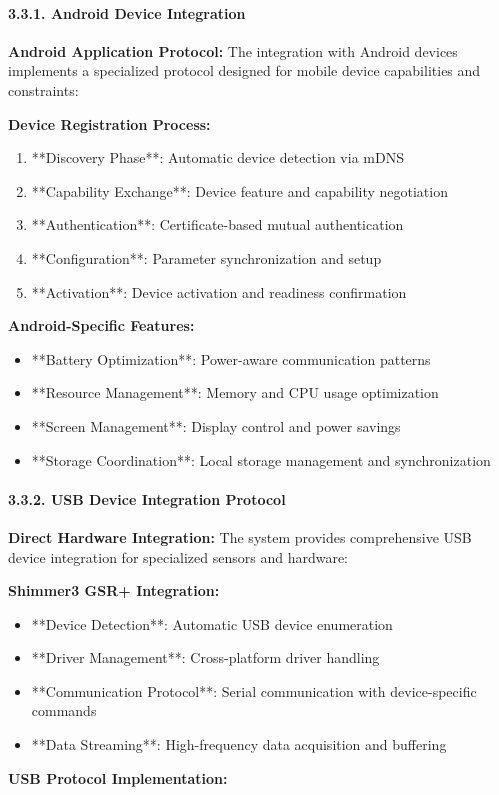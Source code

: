 \documentclass[12pt,a4paper]{article}
\begin{document}
\paragraph{3.3.1. Android Device Integration}

\textbf{Android Application Protocol:}
The integration with Android devices implements a specialized protocol designed for mobile device capabilities and
constraints:

\textbf{Device Registration Process:}

\begin{enumerate}
\item **Discovery Phase**: Automatic device detection via mDNS
\item **Capability Exchange**: Device feature and capability negotiation
\item **Authentication**: Certificate-based mutual authentication
\item **Configuration**: Parameter synchronization and setup
\item **Activation**: Device activation and readiness confirmation

\end{enumerate}
\textbf{Android-Specific Features:}

\begin{itemize}
\item **Battery Optimization**: Power-aware communication patterns
\item **Resource Management**: Memory and CPU usage optimization
\item **Screen Management**: Display control and power savings
\item **Storage Coordination**: Local storage management and synchronization

\end{itemize}
\paragraph{3.3.2. USB Device Integration Protocol}

\textbf{Direct Hardware Integration:}
The system provides comprehensive USB device integration for specialized sensors and hardware:

\textbf{Shimmer3 GSR+ Integration:}

\begin{itemize}
\item **Device Detection**: Automatic USB device enumeration
\item **Driver Management**: Cross-platform driver handling
\item **Communication Protocol**: Serial communication with device-specific commands
\item **Data Streaming**: High-frequency data acquisition and buffering

\end{itemize}
\textbf{USB Protocol Implementation:}
\end{document}
